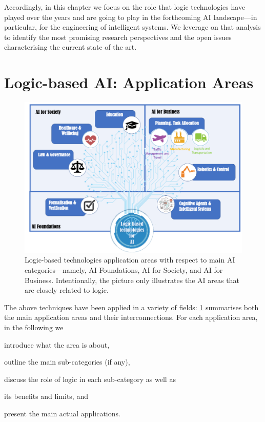 \documentclass[12pt,a4paper,openright,twoside]{book}
\begin{document}
Accordingly, in this chapter we focus on the role that logic technologies have played over the years and are going to play in the forthcoming AI landscape---in particular, for the engineering of intelligent systems.
%
We leverage on that analysis to identify the most promising research perspectives and the open issues characterising the current state of the art.

\section{Logic-based AI: Application Areas}\label{sec:application}

\begin{figure}
    \centering\includegraphics[width=\linewidth]{figures/logicForAI.png}
    \caption[Logic-based technologies application areas w.r.t. main AI categories]{Logic-based technologies application areas with respect to main AI categories---namely, AI Foundations, AI for Society, and AI for Business.  Intentionally, the picture only illustrates the AI areas that are closely related to logic.}
    \label{fig:logicBasedAIArea}
\end{figure}

The above techniques have been applied in a variety of fields: \cref{fig:logicBasedAIArea} summarises both the main application areas and their interconnections.
%
For each application area, in the following we
%
\begin{inlinelist}
    \item introduce what the area is about,
    \item outline the main sub-categories (if any),
    \item discuss the role of logic in each sub-category as well as
    \item its benefits and limits, and
    \item present the main actual applications.
\end{inlinelist}
\end{document}
